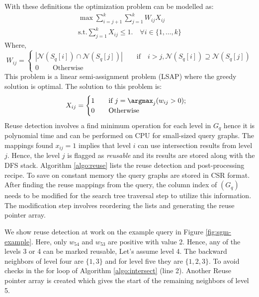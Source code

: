 {With these definitions the optimization problem can be modelled as:
\begin{align}
    \max \sum_{i=j+1}^{k}\sum_{j=1}^{k} W_{ij} X_{ij} \\
    \text{s.t.}
    \sum_{j=1}^k X_{ij} \leq 1. \quad \forall i \in \{1, \dots, k\}
\end{align}
Where, $$
    W_{ij} = \begin{cases}
        |\mathcal{N}(S_q[i]) \cap \mathcal{N}(S_q[j])| \qquad \text{if} \quad i>j, \mathcal{N}(S_q[i]) \supseteq \mathcal{N}(S_q[j]) \\
        0   \qquad \text{Otherwise}
    \end{cases}
$$
This problem is a linear semi-assignment problem (LSAP) where the greedy solution is optimal.
The solution to this problem is:
$$
    X_{ij}=\begin{cases}
        1   \qquad \text{if } j=\argmax_j(w_{ij}>0); \\
        0   \qquad \text{Otherwise}
    \end{cases}
$$
Reuse detection involves a find minimum operation for each level in $G_q$ hence it is polynomial time and can be performed on CPU for small-sized query graphs.
The mappings found $x_{ij} = 1$ implies that level $i$ can use intersection results from level $j$.
Hence, the level $j$ is flagged as \textit{reusable} and its results are stored along with the DFS stack.
Algorithm \ref{algo:reuse} lists the reuse detection and post-processing recipe.
To save on constant memory the query graphs are stored in CSR format.
After finding the reuse mappings from the query, the column index of $(G_q)$ needs to be modified for the search tree traversal step to utilize this information.
The modification step involves reordering the lists and generating the reuse pointer array.

We show reuse detection at work on the example query in Figure \ref{fig:sgm-example}.
Here, only $w_{54}$ and $w_{53}$ are positive with value 2. Hence, any of the levels 3 or 4 can be marked reusable, Let's assume level 4.
The backward neighbors of level four are $\{1,3\}$ and for level five they are $\{1,2,3\}$. To avoid checks in the for loop of Algorithm \ref{algo:intersect} (line 2).
Another Reuse pointer array is created which gives the start of the remaining neighbors of level 5.

}
